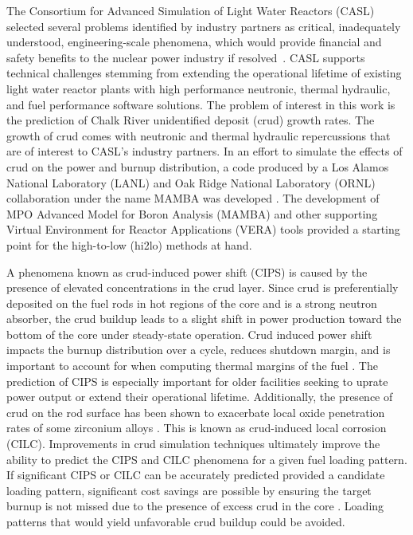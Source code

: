 
The Consortium for Advanced Simulation of Light Water Reactors (CASL) selected several problems identified by industry partners as critical, inadequately understood, engineering-scale phenomena, which would provide
financial and safety benefits to the nuclear power industry if resolved~\cite{Turinsky15}.  CASL supports technical challenges stemming from extending the operational lifetime of existing light water reactor plants with high performance neutronic, thermal hydraulic, and fuel performance software solutions.
The problem of
interest in this work is the prediction of Chalk River unidentified deposit
(crud) growth rates.  The growth of crud comes with neutronic and thermal
hydraulic repercussions that are of interest to CASL's industry partners.
In an effort to simulate the
effects of crud on the power and burnup distribution, a code produced by a Los Alamos National Laboratory (LANL)
and Oak Ridge National Laboratory (ORNL) collaboration under the name MAMBA was developed  \cite{collins16}.
The development of MPO Advanced Model for Boron Analysis (MAMBA) and other supporting Virtual Environment for Reactor Applications (VERA) tools provided a starting point for the high-to-low (hi2lo) methods at hand.
 

A phenomena known as crud-induced power shift (CIPS) is caused by the presence
of elevated  concentrations in the crud layer.  Since crud is preferentially
deposited on the fuel rods in hot regions of the core and  is a strong neutron absorber, the crud buildup leads to a slight shift in
power production toward the bottom of the core under steady-state operation.
Crud induced power shift impacts the burnup distribution over a cycle, reduces shutdown margin,
and is important to account for when computing thermal
margins of the fuel \cite{lange2017}.  The prediction
of CIPS is especially important for older facilities seeking to uprate power
output or extend their operational lifetime.  Additionally, the presence of crud on the rod surface has been shown
to exacerbate local oxide penetration rates of some zirconium alloys \cite{adamson07}.
This is known as crud-induced local corrosion (CILC).  Improvements in crud
simulation techniques ultimately improve the ability to predict the CIPS and
CILC phenomena for a given fuel loading pattern.  If significant CIPS or CILC can be accurately predicted provided a candidate loading pattern, significant cost savings are possible by ensuring the target burnup is not missed due to the presence of excess crud in the core \cite{lange2017}.  Loading patterns that would yield unfavorable crud buildup could be avoided.
  

